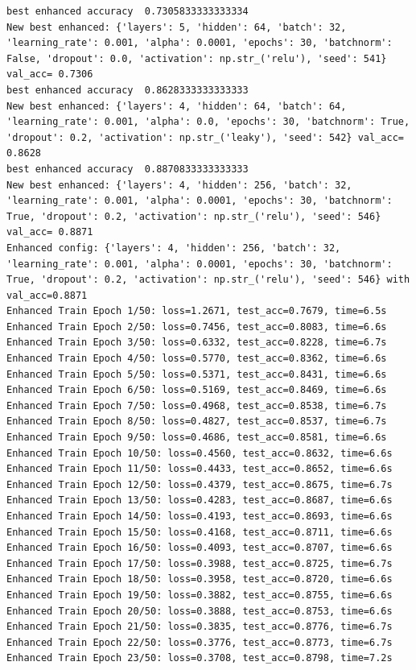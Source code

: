 \documentclass[
  letterpaper,
  DIV=11,
  numbers=noendperiod]{scrartcl}
\begin{document}
\label{prob2_4}
\begin{verbatim}
best enhanced accuracy  0.7305833333333334
New best enhanced: {'layers': 5, 'hidden': 64, 'batch': 32, 'learning_rate': 0.001, 'alpha': 0.0001, 'epochs': 30, 'batchnorm': False, 'dropout': 0.0, 'activation': np.str_('relu'), 'seed': 541} val_acc= 0.7306
best enhanced accuracy  0.8628333333333333
New best enhanced: {'layers': 4, 'hidden': 64, 'batch': 64, 'learning_rate': 0.001, 'alpha': 0.0, 'epochs': 30, 'batchnorm': True, 'dropout': 0.2, 'activation': np.str_('leaky'), 'seed': 542} val_acc= 0.8628
best enhanced accuracy  0.8870833333333333
New best enhanced: {'layers': 4, 'hidden': 256, 'batch': 32, 'learning_rate': 0.001, 'alpha': 0.0001, 'epochs': 30, 'batchnorm': True, 'dropout': 0.2, 'activation': np.str_('relu'), 'seed': 546} val_acc= 0.8871
Enhanced config: {'layers': 4, 'hidden': 256, 'batch': 32, 'learning_rate': 0.001, 'alpha': 0.0001, 'epochs': 30, 'batchnorm': True, 'dropout': 0.2, 'activation': np.str_('relu'), 'seed': 546} with val_acc=0.8871
Enhanced Train Epoch 1/50: loss=1.2671, test_acc=0.7679, time=6.5s
Enhanced Train Epoch 2/50: loss=0.7456, test_acc=0.8083, time=6.6s
Enhanced Train Epoch 3/50: loss=0.6332, test_acc=0.8228, time=6.7s
Enhanced Train Epoch 4/50: loss=0.5770, test_acc=0.8362, time=6.6s
Enhanced Train Epoch 5/50: loss=0.5371, test_acc=0.8431, time=6.6s
Enhanced Train Epoch 6/50: loss=0.5169, test_acc=0.8469, time=6.6s
Enhanced Train Epoch 7/50: loss=0.4968, test_acc=0.8538, time=6.7s
Enhanced Train Epoch 8/50: loss=0.4827, test_acc=0.8537, time=6.7s
Enhanced Train Epoch 9/50: loss=0.4686, test_acc=0.8581, time=6.6s
Enhanced Train Epoch 10/50: loss=0.4560, test_acc=0.8632, time=6.6s
Enhanced Train Epoch 11/50: loss=0.4433, test_acc=0.8652, time=6.6s
Enhanced Train Epoch 12/50: loss=0.4379, test_acc=0.8675, time=6.7s
Enhanced Train Epoch 13/50: loss=0.4283, test_acc=0.8687, time=6.6s
Enhanced Train Epoch 14/50: loss=0.4193, test_acc=0.8693, time=6.6s
Enhanced Train Epoch 15/50: loss=0.4168, test_acc=0.8711, time=6.6s
Enhanced Train Epoch 16/50: loss=0.4093, test_acc=0.8707, time=6.6s
Enhanced Train Epoch 17/50: loss=0.3988, test_acc=0.8725, time=6.7s
Enhanced Train Epoch 18/50: loss=0.3958, test_acc=0.8720, time=6.6s
Enhanced Train Epoch 19/50: loss=0.3882, test_acc=0.8755, time=6.6s
Enhanced Train Epoch 20/50: loss=0.3888, test_acc=0.8753, time=6.6s
Enhanced Train Epoch 21/50: loss=0.3835, test_acc=0.8776, time=6.7s
Enhanced Train Epoch 22/50: loss=0.3776, test_acc=0.8773, time=6.7s
Enhanced Train Epoch 23/50: loss=0.3708, test_acc=0.8798, time=7.2s

\end{verbatim}
\end{document}
